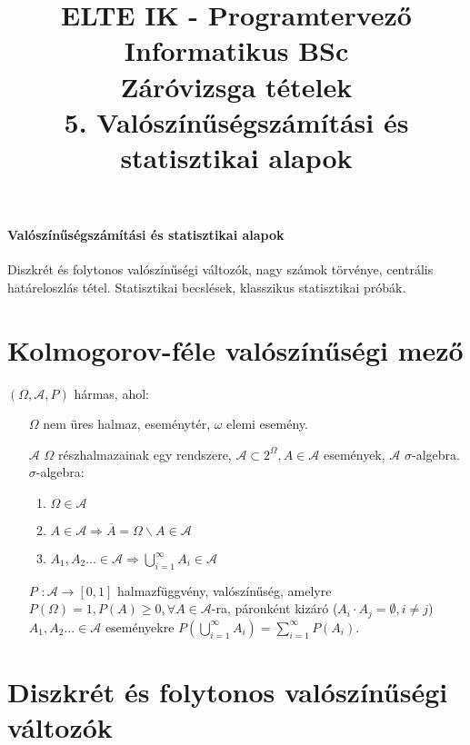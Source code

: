 \documentclass[margin=0px]{article}
\title{\textbf{{\Large ELTE IK - Programtervező Informatikus BSc} \vspace{0.2cm} \\ {\huge Záróvizsga tételek}} \vspace{0.3cm} \\ 5. Valószínűségszámítási és statisztikai alapok}
\author{}
\date{}
\newenvironment{tetel}[1]{\paragraph{#1 \\}}{}
\begin{document}
\maketitle

\begin{tetel}{Valószínűségszámítási és statisztikai alapok}
    Diszkrét és folytonos valószínűségi változók, nagy számok törvénye, centrális határeloszlás tétel. Statisztikai becslések, klasszikus statisztikai próbák.
\end{tetel}

\section{Kolmogorov-féle valószínűségi mező}

$(\Omega, \mathcal{A}, P)$ hármas, ahol:
\begin{itemize}
    \item [$\Omega$] nem üres halmaz, eseménytér, $\omega$ elemi esemény.
    \item [$\mathcal{A}$] $\Omega$ részhalmazainak egy rendszere, $\mathcal{A} \subset 2^{\Omega}, A \in \mathcal{A}$ események, $\mathcal{A}$ $\sigma$-algebra. \\
          $\sigma$-algebra:
          \begin{enumerate}
              \item $\Omega \in \mathcal{A}$
              \item $A \in \mathcal{A} \Rightarrow \overline{A} = \Omega \backslash A \in \mathcal{A}$
              \item $A_{1}, A_{2}... \in \mathcal{A} \Rightarrow \bigcup_{i=1}^{\infty}{A_{i}} \in \mathcal{A}$
          \end{enumerate}
    \item [$P$] $: \mathcal{A} \to [0,1]$ halmazfüggvény, valószínűség, amelyre $P(\Omega) = 1, P(A) \geq 0, \forall A \in \mathcal{A}$-ra, páronként kizáró ($A_{i} \cdot A_{j} = \emptyset, i \neq j$) $A_{1}, A_{2}... \in \mathcal{A}$ eseményekre $P(\bigcup_{i=1}^{\infty}{A_{i}}) = \sum_{i=1}^{\infty}{P(A_{i})}$.
\end{itemize}

\section{Diszkrét és folytonos valószínűségi változók}
\end{document}
